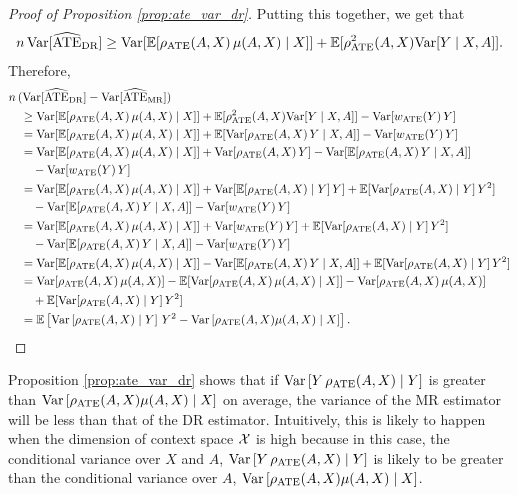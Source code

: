 \begin{proof}[Proof of Proposition \ref{prop:ate_var_dr}]
    Putting this together, we get that
    \begin{align*}
        n\,\textup{Var}[\widehat{\textup{ATE}}_{\textup{DR}}] \geq \textup{Var}[\mathbb{E}[ \rho_{\textup{ATE}}(A, X)\,\mu(A, X)\mid  X]] + \mathbb{E}[\rho^2_{\textup{ATE}}(A, X)\textup{Var}[Y\mid X, A]].
    \end{align*}
    Therefore, 
    \begin{align*}
        &n\,(\textup{Var}[\widehat{\textup{ATE}}_{\textup{DR}}] - \textup{Var}[\widehat{\textup{ATE}}_{\textup{MR}}]) \\
        &\quad\geq \textup{Var}[\mathbb{E}[ \rho_{\textup{ATE}}(A, X)\,\mu(A, X)\mid  X]] + \mathbb{E}[\rho^2_{\textup{ATE}}(A, X)\textup{Var}[Y\mid X, A]] - \textup{Var}[w_{\textup{ATE}}(Y)\,Y]\\
        &\quad= \textup{Var}[\mathbb{E}[ \rho_{\textup{ATE}}(A, X)\,\mu(A, X)\mid  X]] + \mathbb{E}[\textup{Var}[\rho_{\textup{ATE}}(A, X)\,Y\mid X, A]] - \textup{Var}[w_{\textup{ATE}}(Y)\,Y]\\
        &\quad= \textup{Var}[\mathbb{E}[ \rho_{\textup{ATE}}(A, X)\,\mu(A, X)\mid  X]] + \textup{Var}[\rho_{\textup{ATE}}(A, X)\, Y] - \textup{Var}[\mathbb{E}[\rho_{\textup{ATE}}(A, X)\,Y\mid X, A]]\\
        &\qquad- \textup{Var}[w_{\textup{ATE}}(Y)\,Y]\\
        &\quad= \textup{Var}[\mathbb{E}[ \rho_{\textup{ATE}}(A, X)\,\mu(A, X)\mid  X]] + \textup{Var}[\mathbb{E}[\rho_{\textup{ATE}}(A, X)\mid Y]\, Y] + \mathbb{E}[\textup{Var}[\rho_{\textup{ATE}}(A, X)\mid Y]\,Y^2]\\
        &\qquad- \textup{Var}[\mathbb{E}[\rho_{\textup{ATE}}(A, X)\,Y\mid X, A]]- \textup{Var}[w_{\textup{ATE}}(Y)\,Y]\\
        &\quad= \textup{Var}[\mathbb{E}[ \rho_{\textup{ATE}}(A, X)\,\mu(A, X)\mid  X]] + \textup{Var}[w_{\textup{ATE}}(Y)\, Y] + \mathbb{E}[\textup{Var}[\rho_{\textup{ATE}}(A, X)\mid Y]\,Y^2]\\
        &\qquad- \textup{Var}[\mathbb{E}[\rho_{\textup{ATE}}(A, X)\,Y\mid X, A]]- \textup{Var}[w_{\textup{ATE}}(Y)\,Y]\\
        &\quad= \textup{Var}[\mathbb{E}[ \rho_{\textup{ATE}}(A, X)\,\mu(A, X)\mid  X]]- \textup{Var}[\mathbb{E}[\rho_{\textup{ATE}}(A, X)\,Y\mid X, A]] + \mathbb{E}[\textup{Var}[\rho_{\textup{ATE}}(A, X)\mid Y]\,Y^2]\\
        &\quad= \textup{Var}[\rho_{\textup{ATE}}(A, X)\,\mu(A, X)] - \mathbb{E}[\textup{Var}[\rho_{\textup{ATE}}(A, X)\,\mu(A, X)\mid  X]] - \textup{Var}[\rho_{\textup{ATE}}(A, X)\,\mu(A, X)]\\
        &\qquad+ \mathbb{E}[\textup{Var}[\rho_{\textup{ATE}}(A, X)\mid Y]\,Y^2]\\
        &\quad= \mathbb{E} \left[ \textup{Var}\left[ \rho_{\textup{ATE}}(A, X) \mid Y \right]\, Y^2 -  \textup{Var}\left[ \rho_{\textup{ATE}}(A, X)\mu(A, X) \mid X \right] \right].
    \end{align*}
\end{proof}

Proposition \ref{prop:ate_var_dr} shows that if $\textup{Var}\left[Y\, \rho_{\textup{ATE}}(A, X) \mid Y \right]$ is greater than $\textup{Var}\left[ \rho_{\textup{ATE}}(A, X)\mu(A, X) \mid X \right]$ on average, the variance of the MR estimator will be less than that of the DR estimator. Intuitively, this is likely to happen when the dimension of context space $\mathcal{X}$ is high because in this case, the conditional variance over $X$ and $A$, $\textup{Var}\left[Y\, \rho_{\textup{ATE}}(A, X) \mid Y \right]$ is likely to be greater than the conditional variance over $A$, $\textup{Var}\left[ \rho_{\textup{ATE}}(A, X)\mu(A, X) \mid X \right]$.

